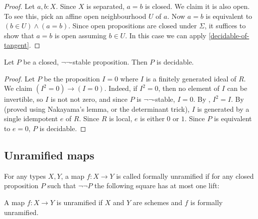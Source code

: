 \begin{proof}
	Let $a, b : X$. Since $X$ is separated, $a = b$ is closed.
	We claim it is also open.
	To see this, pick an affine open neighbourhood $U$ of $a$.
	Now $a = b$ is equivalent to $(b \in U) \wedge (a = b)$.
	Since open propositions are closed under $\Sigma$,
	it suffices to show that $a = b$ is open assuming $b \in U$.
	In this case we can apply \cref{decidable-of-tangent}.
\end{proof}

\begin{proposition}%
	Let $P$ be a closed, $\neg \neg$-stable proposition. Then $P$ is decidable.
\end{proposition}
\begin{proof}
	Let $P$ be the proposition $I = 0$ where $I$ is a finitely generated ideal of $R$.
	We claim $(I^2 = 0) \to (I = 0)$. Indeed, if $I^2 = 0$, then no element of $I$
	can be invertible, so $I$ is not not zero, and since $P$ is $\neg \neg$-stable,
	$I = 0$. By \cite[Proposition 4.1.2]{draft}, $I^2 = I$. By \cite[Lemma II.4.6]{lombardi-quitte}
	(proved using Nakayama's lemma, or the determinant trick), $I$ is
	generated by a single idempotent $e$ of $R$.
	Since $R$ is local, $e$ is either $0$ or $1$. Since $P$ is equivalent to $e = 0$,
	$P$ is decidable.
\end{proof}

\subsection{Unramified maps}

\begin{definition}
For any types $X,Y$, a map $f:X\to Y$ is called formally unramified if for any closed proposition $P$ such that $\neg\neg P$ the following square has at most one lift:
 \begin{center}
    \end{center}
\end{definition}

\begin{definition}
A map $f:X\to Y$ is unramified if $X$ and $Y$ are schemes and $f$ is formally unramified.
\end{definition}

